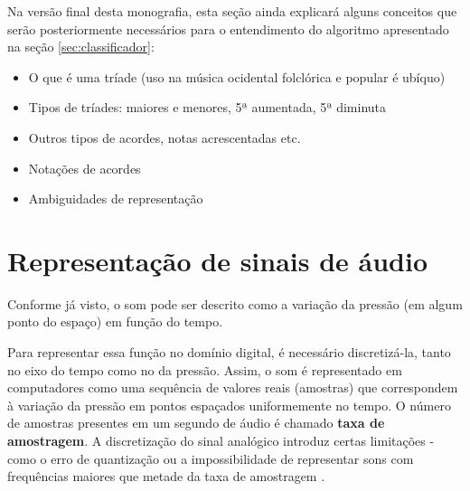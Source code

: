    Na versão final desta monografia, esta seção ainda explicará alguns conceitos que serão posteriormente necessários para o entendimento do algoritmo apresentado na seção \ref{sec:classificador}:

    \begin{itemize}
        \item O que é uma tríade (uso na música ocidental folclórica e popular é ubíquo)
        \item Tipos de tríades: maiores e menores, 5ª aumentada, 5ª diminuta
        \item Outros tipos de acordes, notas acrescentadas etc.
        \item Notações de acordes
        \item Ambiguidades de representação
    \end{itemize}



\section{Representação de sinais de áudio}
    
    Conforme já visto, o som pode ser descrito como a variação da pressão (em algum ponto do espaço) em função do tempo.
    
    Para representar essa função no domínio digital, é necessário discretizá-la, tanto no eixo do tempo como no da pressão. Assim, o som é representado em computadores como uma sequência de valores reais (amostras) que correspondem à variação da pressão em pontos espaçados uniformemente no tempo. O número de amostras presentes em um segundo de áudio é chamado \textbf{taxa de amostragem}. A discretização do sinal analógico introduz certas limitações - como o erro de quantização ou a impossibilidade de representar sons com frequências maiores que metade da taxa de amostragem \citep[ver][seções 1.3.2 e 1.6]{dsp}.
    
